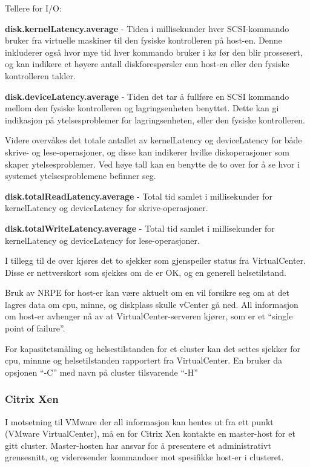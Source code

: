 Tellere for I/O:

{\bf disk.kernelLatency.average} - Tiden i millisekunder hver SCSI-kommando bruker fra virtuelle maskiner til den fysiske kontrolleren på host-en. Denne inkluderer også hvor mye tid hver kommando bruker i kø før den blir prossesert, og kan indikere et høyere antall diskforespørsler enn host-en eller den fysiske kontrolleren takler.
 
{\bf disk.deviceLatency.average} - Tiden det tar å fullføre en SCSI kommando mellom den fysiske kontrolleren og lagringsenheten benyttet. Dette kan gi indikasjon på ytelsesproblemer for lagringsenheten, eller den fysiske kontrolleren. 

Videre overvåkes det totale antallet av kernelLatency og deviceLatency for både skrive- og lese-operasjoner, og disse kan indikerer hvilke diskoperasjoner som skaper ytelsesproblemer. Ved høye tall kan en benytte de to over for å se hvor i systemet ytelsesproblemene befinner seg. 

{\bf disk.totalReadLatency.average} - Total tid samlet i millisekunder for kernelLatency og deviceLatency for skrive-operasjoner. 

{\bf disk.totalWriteLatency.average} - Total tid samlet i millisekunder for kernelLatency og deviceLatency for lese-operasjoner.

I tillegg til de over kjøres det to sjekker som gjenspeiler status fra VirtualCenter. Disse er nettverskort som sjekkes om de er OK, og en generell helsetilstand. 

Bruk av NRPE for host-er kan være aktuelt om en vil forsikre seg om at det lagres data om cpu, minne, og diskplass skulle vCenter gå ned. All informasjon om host-er avhenger nå av at VirtualCenter-serveren kjører, som er et ``single point of failure''.

For kapasitetsmåling og helsestilstanden for et cluster kan det settes sjekker for cpu, minnne og helsetilstanden rapportert fra VirtualCenter. En bruker da opsjonen ``-C'' med navn på cluster tilsvarende ``-H''

\subsubsection{Citrix Xen}
I motsetning til VMware der all informasjon kan hentes ut fra ett punkt (VMware VirtualCenter), må en for Citrix Xen kontakte en master-host for et gitt cluster. Master-hosten har ansvar for å presentere et administrativt grensesnitt, og videresender kommandoer mot spesifikke host-er i clusteret.

